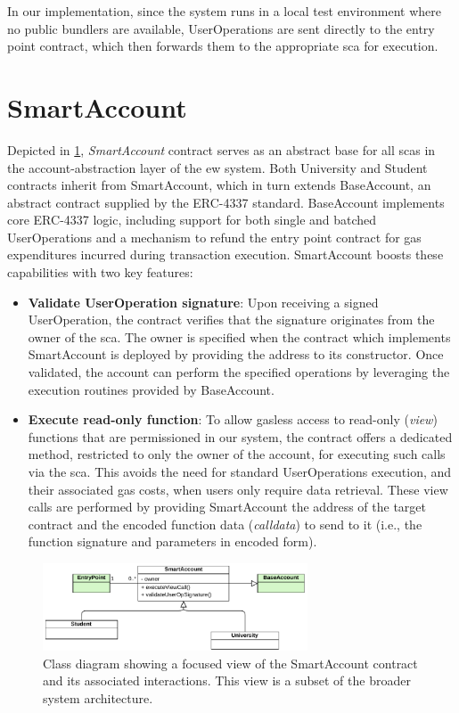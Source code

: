 In our implementation, since the system runs in a local test environment where no public bundlers are available, UserOperations are sent directly to the entry point contract, which then forwards them to the appropriate \gls{sca} for execution.

\section{SmartAccount}
\label{sec:smartAccountDesign}
Depicted in \cref{fig:smartAccountContractClass}, \textit{SmartAccount} contract serves as an abstract base for all \glspl{sca} in the account-abstraction layer of the \gls{ew} system. Both University and Student contracts inherit from SmartAccount, which in turn extends BaseAccount, an abstract contract supplied by the ERC-4337 standard. BaseAccount implements core ERC-4337 logic, including support for both single and batched UserOperations and a mechanism to refund the entry point contract for gas expenditures incurred during transaction execution. SmartAccount boosts these capabilities with two key features:
\begin{itemize}
    \item \textbf{Validate UserOperation signature}: Upon receiving a signed UserOperation, the contract verifies that the signature originates from the owner of the \gls{sca}. The owner is specified when the contract which implements SmartAccount is deployed by providing the address to its constructor. Once validated, the account can perform the specified operations by leveraging the execution routines provided by BaseAccount.
    \item \textbf{Execute read-only function}: To allow gasless access to read-only (\textit{view}) functions that are permissioned in our system, the contract offers a dedicated method, restricted to only the owner of the account, for executing such calls via the \gls{sca}. This avoids the need for standard UserOperations execution, and their associated gas costs, when users only require data retrieval. These view calls are performed by providing SmartAccount the address of the target contract and the encoded function data (\textit{calldata}) to send to it (i.e., the function signature and parameters in encoded form).
\end{itemize}

\begin{figure}
  \centering
  \includegraphics[width=0.7\textwidth]{figures/SmartAccount class diagram.pdf}
  \caption[Class diagram focused on SmartAccount contract]{Class diagram showing a focused view of the SmartAccount contract and its associated interactions. This view is a subset of the broader system architecture.}
  \label{fig:smartAccountContractClass}
\end{figure}

